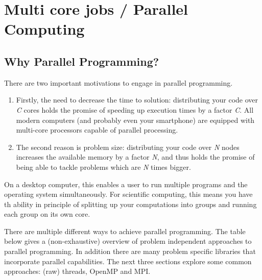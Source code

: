 \chapter{Multi core jobs / Parallel Computing}

\section{Why Parallel Programming?}

There are two important motivations to engage in parallel programming.

\begin{enumerate}

\item  Firstly, the need to decrease the time to solution: distributing your
  code over \emph{C} cores holds the promise of speeding up execution times
  by a factor \emph{C}. All modern computers (and probably even your
  smartphone) are equipped with multi-core processors capable of parallel
  processing.
\item  The second reason is problem size: distributing your code over
  \emph{N} nodes increases the available memory by a factor \emph{N}, and
  thus holds the promise of being able to tackle problems which are \emph{N}
  times bigger.
\end{enumerate}

On a desktop computer, this enables a user to run multiple programs and the
operating system simultaneously. For scientific computing, this means you have
th ability in principle of splitting up your computations into groups and
running each group on its own core.

There are multiple different ways to achieve parallel programming. The table
below gives a (non-exhaustive) overview of problem independent approaches to
parallel programming. In addition there are many problem specific libraries
that incorporate parallel capabilities. The next three sections explore some
common approaches: (raw) threads, OpenMP and MPI.

